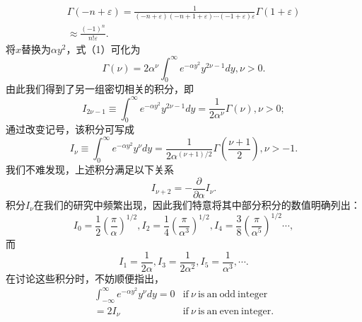 \begin{equation}\tag{17.2.8}\label{eq:17.2.8}
\begin{array}{r} { \Gamma ( - n + \varepsilon ) = \frac { 1 } { ( - n + \varepsilon ) ( - n + 1 + \varepsilon ) \cdots ( - 1 + \varepsilon ) \varepsilon } \Gamma ( 1 + \varepsilon ) } \\{ \approx \frac { ( - 1 ) ^{n} } { n ! \varepsilon } . } \end{array}
\end{equation}
将\(x\)替换为\(\alpha y^{2}\)，式（1）可化为
\begin{equation}\tag{17.2.9}\label{eq:17.2.9}
\Gamma \left( \nu \right) = 2 \alpha ^{\nu} \int _ { 0 } ^{\infty} e ^{- \alpha y ^ { 2} } y ^{2 \nu - 1} d y ,  \nu > 0 .
\end{equation}
由此我们得到了另一组密切相关的积分，即
\begin{equation}\tag{17.2.10}\label{eq:17.2.10}
I _ { 2 \nu - 1 } \equiv \int _ { 0 } ^{\infty} e ^{- \alpha y ^ { 2} } y ^{2 \nu - 1} d y = \frac { 1 } { 2 \alpha ^{\nu} } \Gamma ( \nu ) ,  \nu > 0 ;
\end{equation}
通过改变记号，该积分可写成
\begin{equation}\tag{17.2.11}\label{eq:17.2.11}
I _ { \nu } \equiv \int _ { 0 } ^{\infty} e ^{- \alpha y ^ { 2} } y ^{\nu} d y = \frac { 1 } { 2 \alpha ^{( \nu + 1 ) / 2} } \Gamma \left( \frac { \nu + 1 } { 2 } \right) ,  \nu > - 1 .
\end{equation}
我们不难发现，上述积分满足以下关系
\begin{equation}\tag{17.2.12}\label{eq:17.2.12}
I _ { \nu + 2 } = - \frac { \partial } { \partial \alpha } I _ { \nu } .
\end{equation}
积分\(I_{\nu}\)在我们的研究中频繁出现，因此我们特意将其中部分积分的数值明确列出：
\begin{equation}\tag{17.2.13}\label{eq:17.2.13}
I _ { 0 } = \frac { 1 } { 2 } \left( \frac { \pi } { \alpha } \right) ^{1 / 2} ,  I _ { 2 } = \frac { 1 } { 4 } \left( \frac { \pi } { \alpha ^{3} } \right) ^{1 / 2} ,  I _ { 4 } = \frac { 3 } { 8 } \left( \frac { \pi } { \alpha ^{5} } \right) ^{1 / 2} \cdots ,
\end{equation}
而
\begin{equation}\tag{17.2.14}\label{eq:17.2.14}
I _ { 1 } = \frac { 1 } { 2 \alpha } ,  I _ { 3 } = \frac { 1 } { 2 \alpha ^{2} } ,  I _ { 5 } = \frac { 1 } { \alpha ^{3} } , \cdots .
\end{equation}
在讨论这些积分时，不妨顺便指出，
\begin{equation}\tag{17.2.15}\label{eq:17.2.15}
\begin{array}{rl} { \int _ { - \infty } ^{\infty} e ^{- \alpha y ^ { 2} } y ^{\nu} d y = 0 } & {  \mathrm { i f ~ } \nu \mathrm { ~ i s ~ a n ~ o d d ~ i n t e g e r } } \\{ = 2 I _ { \nu } } & {  \mathrm { i f ~ } \nu \mathrm { ~ i s ~ a n ~ e v e n ~ i n t e g e r } . } \end{array}
\end{equation}
